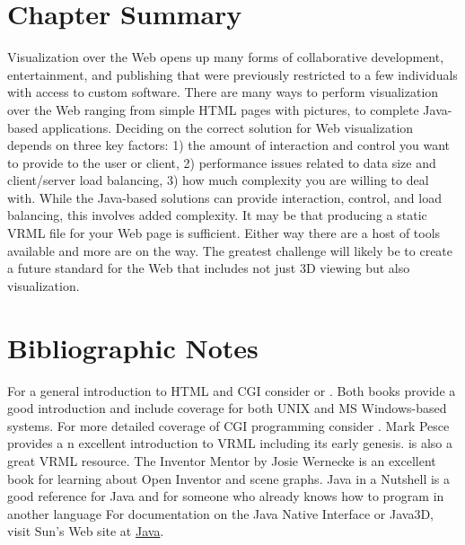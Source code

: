 \section{Chapter Summary}

Visualization over the Web opens up many forms of collaborative development, entertainment, and publishing that were previously restricted to a few individuals with access to custom software. There are many ways to perform visualization over the Web ranging from simple HTML pages with pictures, to complete Java-based applications. Deciding on the correct solution for Web visualization depends on three key factors: 1) the amount of interaction and control you want to provide to the user or client, 2) performance issues related to data size and client/server load balancing, 3) how much complexity you are willing to deal with. While the Java-based solutions can provide interaction, control, and load balancing, this involves added complexity. It may be that producing a static VRML file for your Web page is sufficient. Either way there are a host of tools available and more are on the way. The greatest challenge will likely be to create a future standard for the Web that includes not just 3D viewing but also visualization.

\section{Bibliographic Notes}
\label{sec:ch11.bibliographic_notes}

For a general introduction to HTML and CGI consider \cite{Morris95} or \cite{Graham95}. Both books provide a good introduction and include coverage for both UNIX and MS Windows-based systems. For more detailed coverage of CGI programming consider \cite{Gundavaram96}. Mark Pesce \cite{Pesce95} provides a n excellent introduction to VRML including its early genesis. \cite{Ames96} is also a great VRML resource. The Inventor Mentor by Josie Wernecke \cite{Wernecke94} is an excellent book for learning about Open Inventor and scene graphs. Java in a Nutshell \cite{Flanagan96} is a good reference for Java and for someone who already knows how to program in another language For documentation on the Java Native Interface or Java3D, visit Sun's Web site at \href{https://www.java.com/en/}{Java}.


\printbibliography
